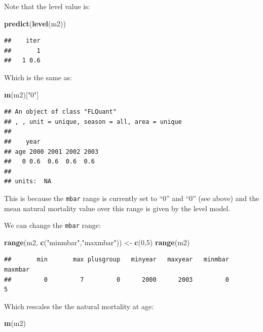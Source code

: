 \documentclass[
]{book}
\newenvironment{Shaded}{\begin{snugshade}}{\end{snugshade}}
\newcommand{\DecValTok}[1]{\textcolor[rgb]{0.00,0.00,0.81}{#1}}
\newcommand{\FunctionTok}[1]{\textcolor[rgb]{0.13,0.29,0.53}{\textbf{#1}}}
\newcommand{\NormalTok}[1]{#1}
\newcommand{\OtherTok}[1]{\textcolor[rgb]{0.56,0.35,0.01}{#1}}
\newcommand{\StringTok}[1]{\textcolor[rgb]{0.31,0.60,0.02}{#1}}
\begin{document}
Note that the level value is:

\begin{Shaded}
\begin{Highlighting}[]
\FunctionTok{predict}\NormalTok{(}\FunctionTok{level}\NormalTok{(m2))}
\end{Highlighting}
\end{Shaded}

\begin{verbatim}
##    iter
##       1
##   1 0.6
\end{verbatim}

Which is the same as:

\begin{Shaded}
\begin{Highlighting}[]
\FunctionTok{m}\NormalTok{(m2)[}\StringTok{"0"}\NormalTok{]}
\end{Highlighting}
\end{Shaded}

\begin{verbatim}
## An object of class "FLQuant"
## , , unit = unique, season = all, area = unique
## 
##    year
## age 2000 2001 2002 2003
##   0 0.6  0.6  0.6  0.6 
## 
## units:  NA
\end{verbatim}

This is because the \texttt{mbar} range is currently set to ``0'' and ``0'' (see above) and the mean natural mortality value over this range is given by the level model.

We can change the \texttt{mbar} range:

\begin{Shaded}
\begin{Highlighting}[]
\FunctionTok{range}\NormalTok{(m2, }\FunctionTok{c}\NormalTok{(}\StringTok{"minmbar"}\NormalTok{,}\StringTok{"maxmbar"}\NormalTok{)) }\OtherTok{\textless{}{-}} \FunctionTok{c}\NormalTok{(}\DecValTok{0}\NormalTok{,}\DecValTok{5}\NormalTok{)}
\FunctionTok{range}\NormalTok{(m2)}
\end{Highlighting}
\end{Shaded}

\begin{verbatim}
##       min       max plusgroup   minyear   maxyear   minmbar   maxmbar 
##         0         7         0      2000      2003         0         5
\end{verbatim}

Which rescales the the natural mortality at age:

\begin{Shaded}
\begin{Highlighting}[]
\FunctionTok{m}\NormalTok{(m2)}
\end{Highlighting}
\end{Shaded}
\end{document}
